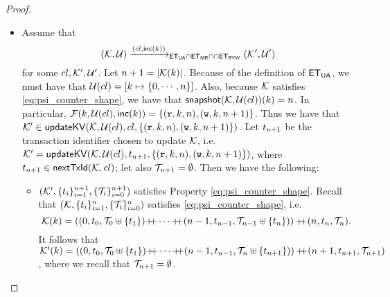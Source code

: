 \begin{proof}
\begin{itemize}
\item 
Assume that
\[
(\mathcal{K}, \mathcal{U}) \xrightarrow{({cl}, \mathsf{inc}(k))}_{\mathsf{ET}_{\mathsf{UA}} \cap \mathsf{ET}_{\mathsf{MR}} \cap \cap \mathsf{ET}_{\mathsf{RYW}}} (\mathcal{K}', \mathcal{U}')
\]
for some ${cl}, \mathcal{K}', \mathcal{U}'$. Let $n+1 = \lvert \mathcal{K}(k) \rvert$. Because of the definition of 
$\mathsf{ET}_{\mathsf{UA}}$, we must have that $\mathcal{U}({cl}) = [k \mapsto \{0, \cdots, n\}]$. Also, 
because $\mathcal{K}$ satisfies \eqref{eq:psi_counter_shape}, we have that $\mathsf{snapshot}(\mathcal{K}, \mathcal{U}({cl}))(k) = n$. 
In particular, $\mathcal{F}(k, \mathcal{U}({cl}), \mathsf{inc}(k)) = \{(\textnormal{\texttt r}, k, n), (\textnormal{\texttt w}, k, n+1)\}$. 
Thus we have that $\mathcal{K}' \in \mathsf{updateKV}(\mathcal{K}, \mathcal{U}({cl}), {cl}, \{(\textnormal{\texttt r}, k, n), (\textnormal{\texttt w}, k, n+1)\})$. 
Let $t_{n+1}$ be the transaction identifier 
chosen to update $\mathcal{K}$, i.e. $\mathcal{K}' = \mathsf{updateKV}(\mathcal{K}, \mathcal{U}({cl}), t_{n+1}, \{(\textnormal{\texttt r}, k, n), (\textnormal{\texttt w}, k, n+1)\})$, 
where $t_{n+1} \in \mathsf{nextTxId}(\mathcal{K}, {cl})$; 
let also $\mathcal{T}_{n+1} = \emptyset$. Then we have the following: 
\begin{itemize}
\item  $(\mathcal{K}', \{t_{i}\}_{i=1}^{n+1}, \{\mathcal{T}_{i}\}_{i=0}^{n+1})$ satisfies Property \eqref{eq:psi_counter_shape}. 
Recall that $(\mathcal{K}, \{t_{i}\}_{i=1}^{n}, \{\mathcal{T}_{i}\}_{i=0}^{n})$ satisfies \eqref{eq:psi_counter_shape}, 
i.e.
\[\mathcal{K}(k) = \left( (0, t_{0}, \mathcal{T}_{0} \uplus \{t_1\}) \mathbb{+\!\!+} \cdots \mathbb{+\!\!+} (n-1, t_{n-1}, \mathcal{T}_{n-1} \uplus \{t_{n}\}) \right) 
\mathbb{+\!\!+} (n, t_{n}, \mathcal{T}_{n}).
\]
It follows that $\mathcal{K}'(k) = \left( (0, t_{0}, \mathcal{T}_{0} \uplus \{t_1\}) \mathbb{+\!\!+} \cdots \mathbb{+\!\!+} (n-1, t_{n-1}, \mathcal{T}_{n} \uplus \{t_{n+1}\}) \right) 
\mathbb{+\!\!+} (n+1, t_{n+1}, \mathcal{T}_{n+1})$, 
where we recall that $\mathcal{T}_{n+1} = \emptyset$.


\end{itemize}
\end{itemize}
\end{proof}
